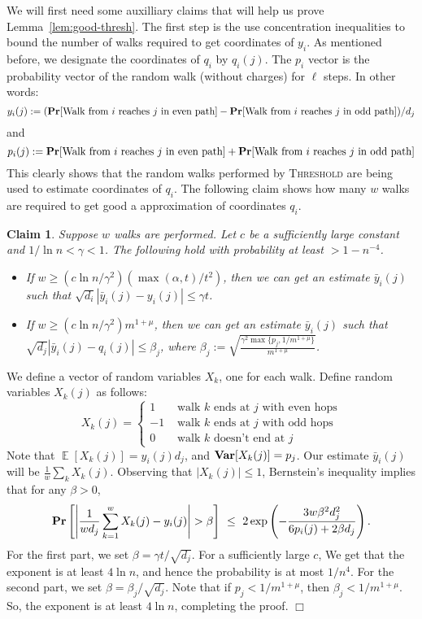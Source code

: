 \documentclass[11pt]{article}
\newtheorem{claim}[theorem]{Claim}
\newenvironment{myproof}{\noindent {\sc Proof:}}{$\Box$}
\newcommand\pr{\mbox{\bf Pr}}
\newcommand\av{\mathop{\mathbb{E}}}
\newcommand\var{\mbox{\bf Var}}
\newcommand\qi{q_i}
\newcommand\qbi{\bar{y}_i}
\newcommand\halfqi{y_i}
\newcommand\Threshold{\textsc{Threshold}\xspace}
\begin{document}
We will first need some auxilliary claims that
will help us prove Lemma~\ref{lem:good-thresh}.
The first step
is the use concentration inequalities to bound
the number of walks required to get coordinates of $\halfqi$.
As mentioned before, we designate the coordinates of $\qi$ by $\qi(j)$. The $p_i$
vector is the probability vector of the random walk (without charges)
for $\ell$ steps. In other words:
$$\halfqi(j) := (\pr[\text{Walk from $i$ reaches $j$ in even path}] - \pr[\text{Walk from $i$ reaches $j$ in odd path}])/d_j$$
and
$$p_i(j) := \pr[\text{Walk from $i$ reaches $j$ in even path}] + \pr[\text{Walk from $i$ reaches $j$ in odd path}]$$
This clearly shows that the random walks performed
by \Threshold{} are being used to estimate coordinates of $\qi$.
The following claim shows how many $w$ walks are required
to get good a approximation of coordinates $\qi$.

\begin{claim} \label{clm:est-qi} Suppose $w$ walks are performed. Let
$c$ be a sufficiently large constant and $1/\ln n < \gamma < 1$. The following
hold with probability at least $> 1 - n^{-4}$.
\begin{itemize}
	\item If $w \geq (c\ln n/\gamma^2) (\max(\alpha,t)/t^2)$, then we can get
	an estimate $\qbi(j)$ such that $\sqrt{d_i}|\qbi(j) - \halfqi(j)| \leq \gamma t$.
	\item If $w \geq (c\ln n/\gamma^2)m^{1+\mu}$, then we can get
	an estimate $\qbi(j)$ such that $\sqrt{d_j}|\qbi(j) - \qi(j)| \leq \beta_j$,
	where $\beta_j :=\sqrt{\frac{\gamma^2\max\{p_j, 1/m^{1+\mu}\}}{m^{1+\mu}}}$.
\end{itemize}
\end{claim}

\begin{myproof} We define a vector of random variables $X_k$, one
for each walk.
Define random variables $X_k(j)$ as follows:
$$X_k(j) = \begin{cases}
1 & \text{ walk $k$ ends at $j$ with even hops} \\
-1 & \text{ walk $k$ ends at $j$ with odd hops} \\
0 & \text{ walk $k$ doesn't end at $j$}
\end{cases}
$$
Note that $\av[X_k(j)] = \halfqi(j)d_j$, and $\var[X_k(j)] = p_j$. Our estimate
$\qbi(j)$ will be $\frac{1}{w}\sum_k X_k(j)$.
Observing that $|X_k(j)| \leq 1$, Bernstein's inequality implies that
for any $\beta > 0$,
$$\pr\left[\left|\frac{1}{wd_j}\sum_{k=1}^w X_k(j) - \halfqi(j)\right| > \beta \right]\
\leq\ 2\exp\left(-\frac{3w\beta^2d_j^2}{6p_i(j) + 2\beta d_j}\right). $$
For the first part, we set $\beta = \gamma t/\sqrt{d_j}$. For a sufficiently large $c$,
We get that the exponent is at least $4\ln n$, and hence the probability
is at most $1/n^4$. For the second part, we set $\beta = \beta_j/\sqrt{d_j}$.
Note that if $p_j < 1/m^{1+\mu}$, then $\beta_j < 1/m^{1+\mu}$.
So, the exponent is at least $4\ln n$, completing the proof.
\end{myproof}\\
\end{document}

